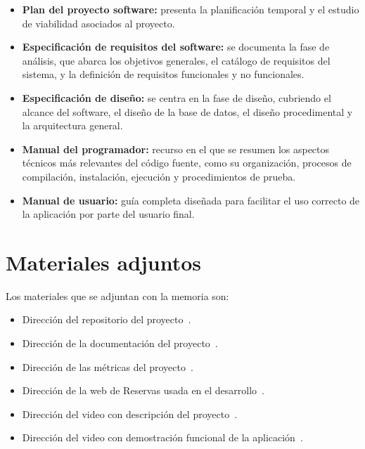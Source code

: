 \begin{itemize}
\tightlist
\item
  \textbf{Plan del proyecto software:} presenta la planificación temporal y el estudio de viabilidad asociados al proyecto.
\item
  \textbf{Especificación de requisitos del software:} se documenta la fase de análisis, que abarca los objetivos generales, el catálogo de requisitos del sistema, y la definición de requisitos funcionales y no funcionales.
\item
  \textbf{Especificación de diseño:} se centra en la fase de diseño, cubriendo el alcance del software, el diseño de la base de datos, el diseño procedimental y la arquitectura general.
\item
  \textbf{Manual del programador:} recurso en el que se resumen los aspectos técnicos más relevantes del código fuente, como su organización, procesos de compilación, instalación, ejecución y procedimientos de prueba.
\item
  \textbf{Manual de usuario:} guía completa diseñada para facilitar el uso correcto de la aplicación por parte del usuario final.
\end{itemize}

\section{Materiales adjuntos}\label{materiales-adjuntos}

Los materiales que se adjuntan con la memoria son: 

\begin{itemize}
\tightlist
\item
	Dirección del repositorio del proyecto~\cite{reservapp:repo}.
\item
	Dirección de la documentación del proyecto~\cite{reservapp:documentacion}.
\item	
	Dirección de las métricas del proyecto~\cite{reservapp:sonarcloud}.
\item	
    Dirección de la web de Reservas usada en el desarrollo~\cite{reservapp:app}.
\item
	Dirección del video con descripción del proyecto~\cite{reservapp:descripcion}.
\item	
	Dirección del video con demostración funcional de la aplicación~\cite{reservapp:demostracion}.
\end{itemize}
